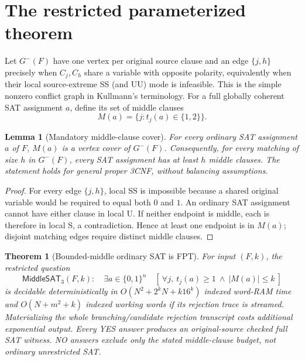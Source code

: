 \documentclass[10pt]{article}
\newtheorem{theorem}{Theorem}
\newtheorem{lemma}{Lemma}
\begin{document}
\section{The restricted parameterized theorem}
Let $G^-(F)$ have one vertex per original source clause and an edge $\{j,h\}$ precisely when $C_j,C_h$ share a variable with opposite polarity, equivalently when their local source-extreme SS (and UU) mode is infeasible. This is the simple nonzero conflict graph in Kullmann's terminology. For a full globally coherent SAT assignment $a$, define its set of middle clauses
\[
 M(a)=\{j:t_j(a)\in\{1,2\}\}.
\]
\begin{lemma}[Mandatory middle-clause cover]
For every ordinary SAT assignment $a$ of $F$, $M(a)$ is a vertex cover of $G^-(F)$. Consequently, for every matching of size $h$ in $G^-(F)$, every SAT assignment has at least $h$ middle clauses. The statement holds for general proper 3CNF, without balancing assumptions.
\end{lemma}
\begin{proof}
For every edge $\{j,h\}$, local SS is impossible because a shared original variable would be required to equal both $0$ and $1$. An ordinary SAT assignment cannot have either clause in local U. If neither endpoint is middle, each is therefore in local S, a contradiction. Hence at least one endpoint is in $M(a)$; disjoint matching edges require distinct middle clauses.
\end{proof}
\begin{theorem}[Bounded-middle ordinary SAT is FPT]
For input $(F,k)$, the restricted question
\[
 \mathsf{MiddleSAT}_3(F,k):\quad \exists a\in\{0,1\}^n\quad
 [\ \forall j,\ t_j(a)\ge1\ \wedge\ |M(a)|\le k\ ]
\]
is decidable deterministically in $O(N^2+2^k N+k16^k)$ indexed word-RAM time and $O(N+m^2+k)$ indexed working words if its rejection trace is streamed. Materializing the whole branching/candidate rejection transcript costs additional exponential output. Every YES answer produces an original-source checked full SAT witness. NO answers exclude only the stated middle-clause budget, not ordinary unrestricted SAT.
\end{theorem}
\end{document}
